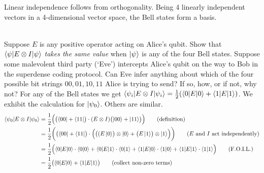  Linear independence follows from orthogonality.  Being 4 linearly independent vectors in a 4-dimensional vector space, the Bell states form a basis.
\begin{comment}
First, we prove $\{\ket{\psi_i} \}$ is a linearly independent basis.
\begin{align*}
    &a_1 \ket{\psi_1} + a_2 \ket{\psi_2} + a_3 \ket{\psi_3} + a_4 \ket{\psi_4} = 0\\
    &\therefore \frac{1}{\sqrt{2}} \begin{bmatrix}
        a_1 + a_2 \\
        a_3 + a_4 \\
        a_3 - a_4 \\
        a_1 - a_2
    \end{bmatrix} = 0
\end{align*}
\begin{subnumcases}
 \therefore {}
a_1 + a_2 = 0& \nonumber \\
a_3+ a_4 = 0& \nonumber \\
a_3 - a_4 = 0& \nonumber \\
a_1 - a_2 = 0& \nonumber
\end{subnumcases}
\begin{align*}
    \therefore a_1 = a_2 = a_3 = a_4 = 0
\end{align*}
Thus $\{\ket{\psi_i}\}$ is a linearly independent basis.

Moreover $\norm{\ket{\psi_i}} = 1$ and $\braket{\psi_i | \psi_j} = \delta_{ij}$ for $i,j = 1, 2, 3, 4$.
Therefore $\{\ket{\psi_i}\}$ forms an orthonormal basis.
\end{comment}
\\
 Suppose $E$ is any positive operator acting on Alice's qubit.  Show that $\braket{\psi|E\otimes I|\psi}$ \textit{takes the same value} when $\ket{\psi}$ is any of the four Bell states.  Suppose some malevolent third party (`Eve') intercepts Alice's qubit on the way to Bob in the superdense coding protocol.  Can Eve infer anything about which of the four possible bit strings $00, 01, 10, 11$ Alice is trying to send?  If so, how, or if not, why not?
\Soln
For any of the Bell states we get $\braket{\psi_i | E \otimes I | \psi_i} = \frac{1}{2} (\braket{0|E|0} + \braket{1|E|1})$.  We exhibit the calculation for $\ket{\psi_0}$.  Others are similar.
\begin{align*}
\braket{\psi_0 | E \otimes I | \psi_0} &= \frac{1}{2}\Bigl(\bigl(\bra{00}+\bra{11}\bigr)\cdot (E\otimes I)\bigl(\ket{00}+\ket{11}\bigr)\Bigr) \tag{definition} \\
&=  \frac{1}{2}\biggl(\bigl(\bra{00}+\bra{11}\bigr)\cdot  \Bigl(\bigl((E\ket{0}\bigr)\otimes\ket{0} + \bigl(E\ket{1}\bigr)\otimes\ket{1}\Bigr)\biggr) \tag{$E$ and $I$ act independently} \\
&= \frac{1}{2}\Bigl(\braket{0|E|0}\cdot\braket{0|0} + \braket{0|E|1}\cdot\braket{0|1} + \braket{1|E|0}\cdot\braket{1|0}+\braket{1|E|1}\cdot\braket{1|1}\Bigr) \tag{F.O.I.L.} \\
&=\frac{1}{2}\bigl(\braket{0|E|0} + \braket{1|E|1}\bigr) \tag{collect non-zero terms}
\end{align*}
